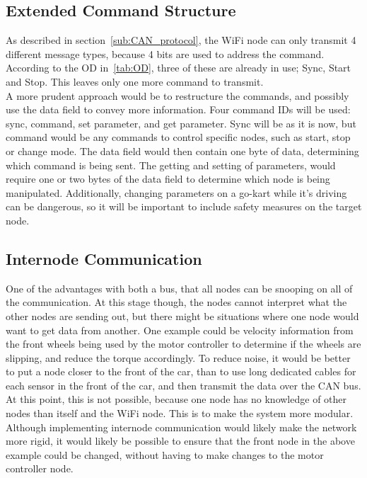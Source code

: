 \subsection*{Extended Command Structure}
As described in section~\ref{sub:CAN_protocol}, the WiFi node can only transmit 4 different message types, because 4 bits are used to address the command. 
According to the OD in~\ref{tab:OD}, three of these are already in use; Sync, Start and Stop. 
This leaves only one more command to transmit.\\

A more prudent approach would be to restructure the commands, and possibly use the data field to convey more information. 
Four command IDs will be used: sync, command, set parameter, and get parameter. 
Sync will be as it is now, but command would be any commands to control specific nodes, such as start, stop or change mode. 
The data field would then contain one byte of data, determining which command is being sent.
The getting and setting of parameters, would require one or two bytes of the data field to determine which node is being manipulated.
Additionally, changing parameters on a go-kart while it's driving can be dangerous, so it will be important to include safety measures on the target node.

\subsection*{Internode Communication}
One of the advantages with both a bus, that all nodes can be snooping on all of the communication.
At this stage though, the nodes cannot interpret what the other nodes are sending out, but there might be situations where one node would want to get data from another.
One example could be velocity information from the front wheels being used by the motor controller to determine if the wheels are slipping, and reduce the torque accordingly. 
To reduce noise, it would be better to put a node closer to the front of the car, than to use long dedicated cables for each sensor in the front of the car, and then transmit the data over the CAN bus.\\

At this point, this is not possible, because one node has no knowledge of other nodes than itself and the WiFi node. 
This is to make the system more modular.
Although implementing internode communication would likely make the network more rigid, it would likely be possible to ensure that the front node in the above example could be changed, without having to make changes to the motor controller node.

